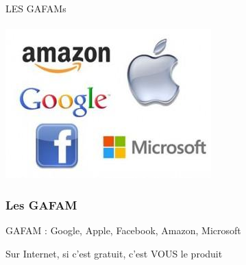 \documentclass{beamer}
\begin{document}
\begin{frame}
\begin{center}
\Huge{LES GAFAMs}\\~\\
\includegraphics[scale=0.5] {./images/gafam.jpg} 
\end{center}
\end{frame}

\begin{frame}
\frametitle{Les GAFAM}
\begin{block}{GAFAM : Google, Apple, Facebook, Amazon, Microsoft}
\begin{itemize}
\end{itemize}
\end{block}
\end{frame}

\begin{frame}
\begin{center}
\Huge{Sur Internet, si c'est gratuit, c'est VOUS le produit}
\end{center}
\end{frame}
\end{document}
